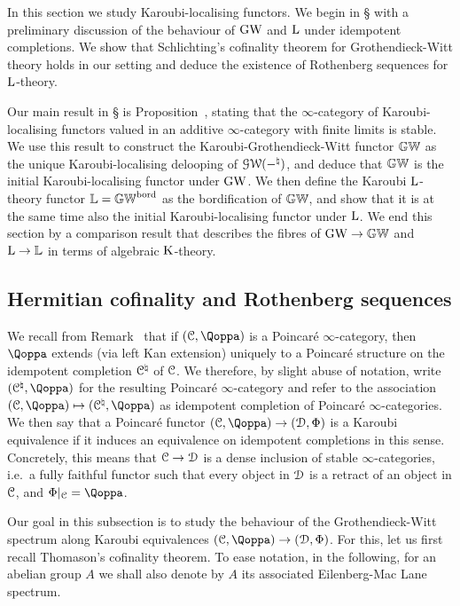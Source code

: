 

In this section we study Karoubi-localising functors.
We begin in \S{} with a preliminary discussion of the behaviour of $\operatorname{GW}$ and $\operatorname L$ under idempotent completions. We show that Schlichting's cofinality theorem for Grothendieck-Witt theory 
holds in our setting 
and deduce the existence of Rothenberg sequences for $\operatorname L$-theory. 

Our main result in \S{} is Proposition~, stating that the $\infty$-category of Karoubi-localising functors valued in an additive $\infty$-category with finite limits is stable. We use this result to construct the Karoubi-Grothendieck-Witt functor $\mathbb{GW}$ as the unique Karoubi-localising delooping of $\operatorname{\mathcal{GW}}(-^{\natural})$, and deduce that $\mathbb{GW}$ is the initial Karoubi-localising functor under $\operatorname{GW}$. We then define the Karoubi $\operatorname L$-theory functor $\mathbb{L} = \mathbb{GW}^{\mathrm{bord}}$ as the bordification of $\mathbb{GW}$, and show that it is at the same time also the initial Karoubi-localising functor under $\operatorname L$. %
We end this section by a comparison result that describes the fibres of $\operatorname{GW}\to \mathbb{GW}$ and $\operatorname L\to \mathbb{L}$ in terms of algebraic $\operatorname K$-theory.

\subsection{Hermitian cofinality and Rothenberg sequences}
\label{subsection:cofinality}%

We recall from Remark~ that if $(\C,\QF)$ is a Poincar\'e $\infty$-category, then $\QF$ extends (via left Kan extension) uniquely to a Poincar\'e structure on the idempotent completion $\mathcal C^\natural$ of $\mathcal C$. We therefore, by slight abuse of notation, write $(\C^\natural,\QF)$ for the resulting Poincar\'e $\infty$-category and refer to the association $(\C,\QF) \mapsto (\C^\natural,\QF)$ as idempotent completion of Poincar\'e $\infty$-categories.
We then say that a Poincaré functor $(\C,\QF) \to (\D,\QFD)$ is a Karoubi equivalence if it induces an equivalence on idempotent completions in this sense. Concretely, this means that $\mathcal C \to \mathcal{D}$ is a dense inclusion of stable $\infty$-categories, i.e.\ a fully faithful functor such that every object in $\mathcal{D}$ is a retract of an object in $\mathcal C$, and $\QFD|_{\C} = \QF$.

Our goal in this subsection is to study the behaviour %
of the Grothendieck-Witt spectrum along Karoubi equivalences $(\C,\QF) \to (\D,\QFD)$.
For this, let us first recall Thomason's cofinality theorem. To ease notation, in the following, for an abelian group $A$ we shall also denote by $A$ its associated Eilenberg-Mac Lane spectrum.

